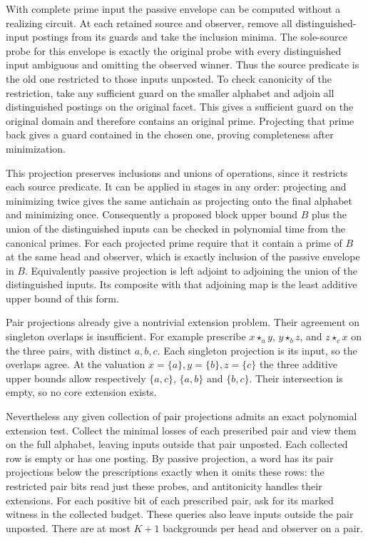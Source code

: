 With complete prime input the passive envelope
can be computed without a realizing circuit.
At each retained source and observer, remove all
distinguished-input postings from its guards and
take the inclusion minima. The sole-source probe
for this envelope is exactly the original probe
with every distinguished input ambiguous and
omitting the observed winner. Thus the source
predicate is the old one restricted to those
inputs unposted. To check canonicity of the
restriction, take any sufficient guard on the
smaller alphabet and adjoin all distinguished
postings on the original facet. This gives a
sufficient guard on the original domain and
therefore contains an original prime. Projecting
that prime back gives a guard contained in the
chosen one, proving completeness after
minimization.

This projection preserves inclusions and unions
of operations, since it restricts each source
predicate. It can be applied in stages in
any order: projecting and minimizing twice
gives the same antichain as projecting onto
the final alphabet and minimizing once.
Consequently a proposed block upper bound
$B$ plus the union of the distinguished inputs
can be checked in polynomial time from the
canonical primes. For each projected prime
require that it contain a prime of $B$ at the
same head and observer, which is exactly
inclusion of the passive envelope in $B$.
Equivalently passive projection is left adjoint to
adjoining the union of the distinguished inputs.
Its composite with that adjoining map is the
least additive upper bound of this form.

Pair projections already give a nontrivial
extension problem. Their agreement on singleton
overlaps is insufficient. For example prescribe
$x\star_a y$, $y\star_b z$, and $z\star_c x$
on the three pairs, with distinct $a,b,c$.
Each singleton projection is its input, so the
overlaps agree. At the valuation
$x=\{a\},y=\{b\},z=\{c\}$ the three additive
upper bounds allow respectively $\{a,c\}$,
$\{a,b\}$ and $\{b,c\}$. Their intersection
is empty, so no core extension exists.

Nevertheless any given collection of pair
projections admits an exact polynomial extension
test. Collect the minimal losses of each
prescribed pair and view them on the full
alphabet, leaving inputs outside that pair
unposted. Each collected row is empty or
has one posting. By passive projection,
a word has its pair projections below the
prescriptions exactly when it omits these
rows: the restricted pair bits read just
these probes, and antitonicity handles their
extensions. For each positive bit of each
prescribed pair, ask for its marked witness
in the collected budget. These queries
also leave inputs outside the pair unposted.
There are at most $K+1$ backgrounds per
head and observer on a pair.

